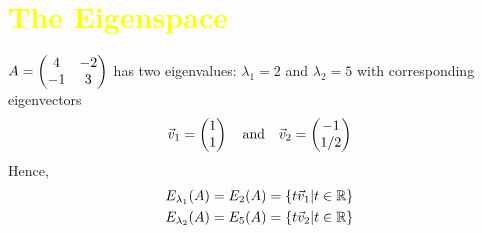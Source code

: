 \documentclass[pdf,9pt]{beamer}
\begin{document}
\section[\textcolor{yellow}{}]{\textcolor{yellow}{The Eigenspace}}
\begin{frame}[fragile]
    \begin{example}
	$A=\begin{pmatrix} 4&-2\cr -1&3 \end{pmatrix} $ has two eigenvalues:
	$\lambda_1=2$ and $\lambda_2=5$ with corresponding eigenvectors
	\begin{align*}
	    \vec{v}_1 =\begin{pmatrix} 1\cr 1 \end{pmatrix}
	    \quad\text{and}\quad
	    \vec{v}_2 =\begin{pmatrix} -1\cr 1/2 \end{pmatrix}
	\end{align*}
	\bigskip
	Hence,
	\begin{align*}
	    E_{\lambda_1}(A) = E_{2}(A) = \left\{ t \vec{v}_1| t\in\mathbb{R} \right\} \\
	    E_{\lambda_2}(A) = E_{5}(A) = \left\{ t \vec{v}_2| t\in\mathbb{R} \right\} \\
	\end{align*}
    \end{example}

\end{frame}
\end{document}
